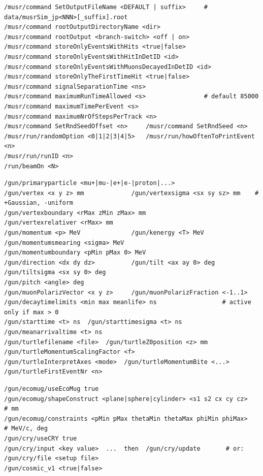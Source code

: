\begin{lstlisting}[style=mac]
/musr/command SetOutputFileName <DEFAULT | suffix>     # data/musrSim_jp<NNN>[_suffix].root
/musr/command rootOutputDirectoryName <dir>
/musr/command rootOutput <branch-switch> <off | on>
/musr/command storeOnlyEventsWithHits <true|false>
/musr/command storeOnlyEventsWithHitInDetID <id>
/musr/command storeOnlyEventsWithMuonsDecayedInDetID <id>
/musr/command storeOnlyTheFirstTimeHit <true|false>
/musr/command signalSeparationTime <ns>
/musr/command maximumRunTimeAllowed <s>                # default 85000
/musr/command maximumTimePerEvent <s>
/musr/command maximumNrOfStepsPerTrack <n>
/musr/command SetRndSeedOffset <n>     /musr/command SetRndSeed <n>
/musr/run/randomOption <0|1|2|3|4|5>   /musr/run/howOftenToPrintEvent <n>
/musr/run/runID <n>
/run/beamOn <N>
\end{lstlisting}

\begin{lstlisting}[style=mac]
/gun/primaryparticle <mu+|mu-|e+|e-|proton|...>
/gun/vertex <x y z> mm             /gun/vertexsigma <sx sy sz> mm    # +Gaussian, -uniform
/gun/vertexboundary <rMax zMin zMax> mm                /gun/vertexrelativer <rMax> mm
/gun/momentum <p> MeV              /gun/kenergy <T> MeV               /gun/momentumsmearing <sigma> MeV
/gun/momentumboundary <pMin pMax 0> MeV
/gun/direction <dx dy dz>          /gun/tilt <ax ay 0> deg            /gun/tiltsigma <sx sy 0> deg
/gun/pitch <angle> deg
/gun/muonPolarizVector <x y z>     /gun/muonPolarizFraction <-1..1>
/gun/decaytimelimits <min max meanlife> ns                  # active only if max > 0
/gun/starttime <t> ns  /gun/starttimesigma <t> ns  /gun/meanarrivaltime <t> ns
/gun/turtlefilename <file>  /gun/turtleZ0position <z> mm  /gun/turtleMomentumScalingFactor <f>
/gun/turtleInterpretAxes <mode>  /gun/turtleMomentumBite <...>  /gun/turtleFirstEventNr <n>
\end{lstlisting}

\begin{lstlisting}[style=mac]
/gun/ecomug/useEcoMug true
/gun/ecomug/shapeConstruct <plane|sphere|cylinder> <s1 s2 cx cy cz>          # mm
/gun/ecomug/constraints <pMin pMax thetaMin thetaMax phiMin phiMax>       # MeV/c, deg
/gun/cry/useCRY true
/gun/cry/input <key value>  ...  then  /gun/cry/update       # or: /gun/cry/file <setup file>
/gun/cosmic_v1 <true|false>
\end{lstlisting}
